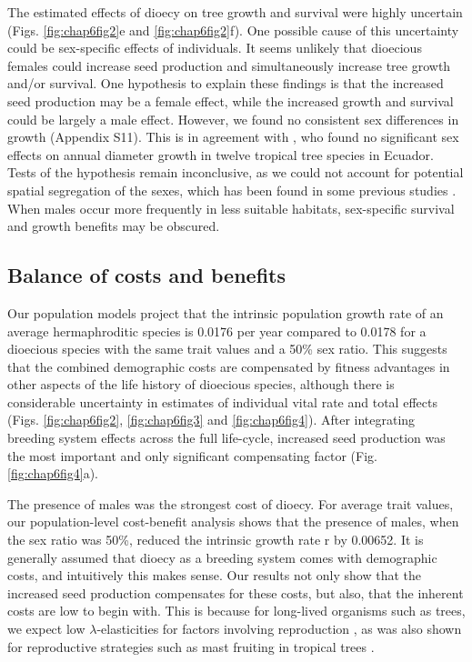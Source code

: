 \documentclass[b5paper,justified]{tufte-book} %
\begin{document}
\begin{fullwidth}
The estimated effects of dioecy on tree growth and survival were highly uncertain (Figs. \ref{fig:chap6fig2}e and \ref{fig:chap6fig2}f). One possible cause of this uncertainty could be sex-specific effects of individuals. It seems unlikely that dioecious females could increase seed production and simultaneously increase tree growth and/or survival. One hypothesis to explain these findings is that the increased seed production may be a female effect, while the increased growth and survival could be largely a male effect. However, we found no consistent sex differences in growth (Appendix S11). This is in agreement with \citet{Queenborough2007}, who found no significant sex effects on annual diameter growth in twelve tropical tree species in Ecuador. Tests of the hypothesis remain inconclusive, as we could not account for potential spatial segregation of the sexes, which has been found in some previous studies \citep{Cox1981, Bierzychudek1988, Queenborough2007, Forero-Montana2010, Ortiz-Pulido2010}. When males occur more frequently in less suitable habitats, sex-specific survival and growth benefits may be obscured. 

\subsection{Balance of costs and benefits}
Our population models project that the intrinsic population growth rate of an average hermaphroditic species is 0.0176 per year compared to 0.0178 for a dioecious species with the same trait values and a 50\% sex ratio. This suggests that the combined demographic costs are compensated by fitness advantages in other aspects of the life history of dioecious species, although there is considerable uncertainty in estimates of individual vital rate and total effects (Figs. \ref{fig:chap6fig2}, \ref{fig:chap6fig3} and \ref{fig:chap6fig4}). After integrating breeding system effects across the full life-cycle, increased seed production was the most important and only significant compensating factor (Fig. \ref{fig:chap6fig4}a).

The presence of males was the strongest cost of dioecy. For average trait values, our population-level cost-benefit analysis shows that the presence of males, when the sex ratio was 50\%, reduced the intrinsic growth rate r by 0.00652. It is generally assumed that dioecy as a breeding system comes with demographic costs, and intuitively this makes sense. Our results not only show that the increased seed production compensates for these costs, but also, that the inherent costs are low to begin with. This is because for long-lived organisms such as trees, we expect low $\lambda$-elasticities for factors involving reproduction \citep{DeKroon2000}, as was also shown for reproductive strategies such as mast fruiting in tropical trees \citep{Visser2011}.
 

\end{fullwidth}
\end{document}
